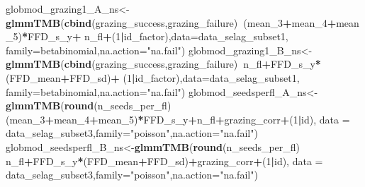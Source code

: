 \documentclass[
]{article}
\newenvironment{Shaded}{\begin{snugshade}}{\end{snugshade}}
\newcommand{\DataTypeTok}[1]{\textcolor[rgb]{0.13,0.29,0.53}{#1}}
\newcommand{\DecValTok}[1]{\textcolor[rgb]{0.00,0.00,0.81}{#1}}
\newcommand{\KeywordTok}[1]{\textcolor[rgb]{0.13,0.29,0.53}{\textbf{#1}}}
\newcommand{\NormalTok}[1]{#1}
\newcommand{\OperatorTok}[1]{\textcolor[rgb]{0.81,0.36,0.00}{\textbf{#1}}}
\newcommand{\StringTok}[1]{\textcolor[rgb]{0.31,0.60,0.02}{#1}}
\begin{document}
\begin{Shaded}
\begin{Highlighting}[]
\NormalTok{globmod_grazing1_A_ns<-}\KeywordTok{glmmTMB}\NormalTok{(}\KeywordTok{cbind}\NormalTok{(grazing_success,grazing_failure)}\OperatorTok{~}\NormalTok{(mean_}\DecValTok{3}\OperatorTok{+}\NormalTok{mean_}\DecValTok{4}\OperatorTok{+}\NormalTok{mean_}\DecValTok{5}\NormalTok{)}\OperatorTok{*}\NormalTok{FFD_s_y}\OperatorTok{+}
\StringTok{                                 }\NormalTok{n_fl}\OperatorTok{+}\NormalTok{(}\DecValTok{1}\OperatorTok{|}\NormalTok{id_factor),}\DataTypeTok{data=}\NormalTok{data_selag_subset1,}
                               \DataTypeTok{family=}\NormalTok{betabinomial,}\DataTypeTok{na.action=}\StringTok{"na.fail"}\NormalTok{)}
\NormalTok{globmod_grazing1_B_ns<-}\KeywordTok{glmmTMB}\NormalTok{(}\KeywordTok{cbind}\NormalTok{(grazing_success,grazing_failure)}\OperatorTok{~}\NormalTok{n_fl}\OperatorTok{+}\NormalTok{FFD_s_y}\OperatorTok{*}\NormalTok{(FFD_mean}\OperatorTok{+}\NormalTok{FFD_sd)}\OperatorTok{+}
\StringTok{                              }\NormalTok{(}\DecValTok{1}\OperatorTok{|}\NormalTok{id_factor),}\DataTypeTok{data=}\NormalTok{data_selag_subset1,}
                              \DataTypeTok{family=}\NormalTok{betabinomial,}\DataTypeTok{na.action=}\StringTok{"na.fail"}\NormalTok{)}
\NormalTok{globmod_seedsperfl_A_ns<-}\KeywordTok{glmmTMB}\NormalTok{(}\KeywordTok{round}\NormalTok{(n_seeds_per_fl)}\OperatorTok{~}
\StringTok{                                }\NormalTok{(mean_}\DecValTok{3}\OperatorTok{+}\NormalTok{mean_}\DecValTok{4}\OperatorTok{+}\NormalTok{mean_}\DecValTok{5}\NormalTok{)}\OperatorTok{*}\NormalTok{FFD_s_y}\OperatorTok{+}\NormalTok{n_fl}\OperatorTok{+}\NormalTok{grazing_corr}\OperatorTok{+}\NormalTok{(}\DecValTok{1}\OperatorTok{|}\NormalTok{id),}
                              \DataTypeTok{data =}\NormalTok{ data_selag_subset3,}\DataTypeTok{family=}\StringTok{"poisson"}\NormalTok{,}\DataTypeTok{na.action=}\StringTok{"na.fail"}\NormalTok{)}
\NormalTok{globmod_seedsperfl_B_ns<-}\KeywordTok{glmmTMB}\NormalTok{(}\KeywordTok{round}\NormalTok{(n_seeds_per_fl)}\OperatorTok{~}
\StringTok{                              }\NormalTok{n_fl}\OperatorTok{+}\NormalTok{FFD_s_y}\OperatorTok{*}\NormalTok{(FFD_mean}\OperatorTok{+}\NormalTok{FFD_sd)}\OperatorTok{+}\NormalTok{grazing_corr}\OperatorTok{+}\NormalTok{(}\DecValTok{1}\OperatorTok{|}\NormalTok{id),}
                         \DataTypeTok{data =}\NormalTok{ data_selag_subset3,}\DataTypeTok{family=}\StringTok{"poisson"}\NormalTok{,}\DataTypeTok{na.action=}\StringTok{"na.fail"}\NormalTok{)}

\end{Highlighting}
\end{Shaded}
\end{document}
